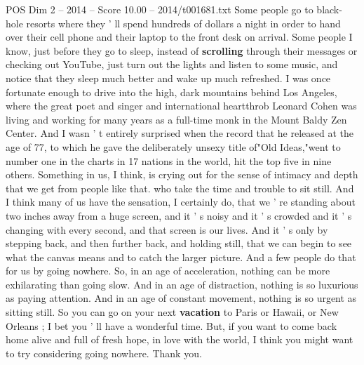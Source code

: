 \begin{textsample}{POS Dim 2 – 2014 – Score 10.00 – 2014/t001681.txt}
Some people go to black-hole resorts where they ' ll spend hundreds of dollars a night in order to hand over their cell phone and their laptop to the front desk on arrival.
Some people I know, just before they go to sleep, instead of \textbf{scrolling} through their messages or checking out YouTube, just turn out the lights and listen to some music, and notice that they sleep much better and wake up much refreshed.
I was once fortunate enough to drive into the high, dark mountains behind Los Angeles, where the great poet and singer and international heartthrob Leonard Cohen was living and working for many years as a full-time monk in the Mount Baldy Zen Center.
And I wasn ' t entirely surprised when the record that he released at the age of 77, to which he gave the deliberately unsexy title of"Old Ideas,"went to number one in the charts in 17 nations in the world, hit the top five in nine others.
Something in us, I think, is crying out for the sense of intimacy and depth that we get from people like that. who take the time and trouble to sit still.
And I think many of us have the sensation, I certainly do, that we ' re standing about two inches away from a huge screen, and it ' s noisy and it ' s crowded and it ' s changing with every second, and that screen is our lives.
And it ' s only by stepping back, and then further back, and holding still, that we can begin to see what the canvas means and to catch the larger picture.
And a few people do that for us by going nowhere.
So, in an age of acceleration, nothing can be more exhilarating than going slow.
And in an age of distraction, nothing is so luxurious as paying attention.
And in an age of constant movement, nothing is so urgent as sitting still.
So you can go on your next \textbf{vacation} to Paris or Hawaii, or New Orleans ; I bet you ' ll have a wonderful time.
But, if you want to come back home alive and full of fresh hope, in love with the world, I think you might want to try considering going nowhere.
Thank you.

\end{textsample}

